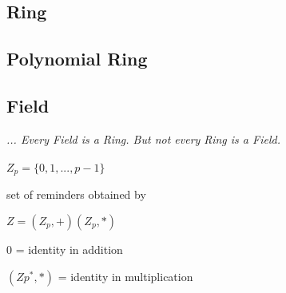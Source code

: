 \documentclass[a4paper]{article}
\begin{document}
\subsection{Ring}




\subsection{Polynomial Ring}




\subsection{Field}

\textit{... Every Field is a Ring. But not every Ring is a Field.}
\\
\\
$Z_p = \{0,1,...,p-1\}$

set of reminders obtained by 

$Z = (Z_p,+) (Z_p,*)$

$0$ = identity in addition

$(Zp^*,*)$ = identity in multiplication
\end{document}
